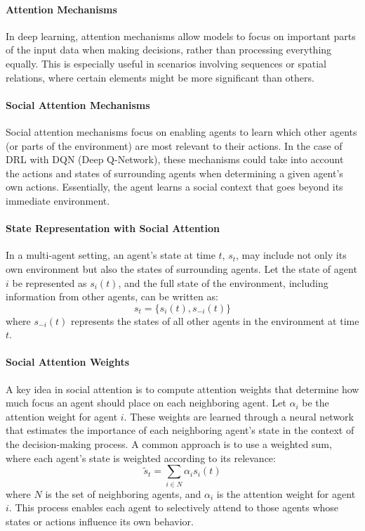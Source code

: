 \begin{enumerate}
\paragraph{Attention Mechanisms} 
In deep learning, attention mechanisms allow models to focus on important parts of the input data when making decisions, 
rather than processing everything equally\cite{vaswani2017attention}. 
This is especially useful in scenarios involving sequences or spatial relations, where certain elements might be more significant than others.

\paragraph{Social Attention Mechanisms} 
Social attention mechanisms focus on enabling agents to learn which other agents (or parts of the environment) are most relevant to their actions. 
In the case of DRL with DQN (Deep Q-Network), these mechanisms could take into account the actions and states of surrounding agents when determining a given agent's own actions. 
Essentially, the agent learns a social context that goes beyond its immediate environment\cite{jiang2018learning}.


\paragraph{State Representation with Social Attention} 
In a multi-agent setting, an agent’s state at time $t$, $s_t$, may include not only its own environment but also the states of surrounding agents. Let the state of agent $i$ be represented as $s_i(t)$, and the full state of the environment, including information from other agents, can be written as:
\[
s_t = \{s_i(t), s_{-i}(t)\}
\]
where $s_{-i}(t)$ represents the states of all other agents in the environment at time $t$\cite{mnih2015human}.

\paragraph{Social Attention Weights} 
A key idea in social attention is to compute attention weights that determine how much focus an agent should place on each neighboring agent. Let $\alpha_i$ be the attention weight for agent $i$. These weights are learned through a neural network that estimates the importance of each neighboring agent's state in the context of the decision-making process. A common approach is to use a weighted sum, where each agent’s state is weighted according to its relevance:
\[
\tilde{s}_t = \sum_{i \in N} \alpha_i s_i(t)
\]
where $N$ is the set of neighboring agents, and $\alpha_i$ is the attention weight for agent $i$. This process enables each agent to selectively attend to those agents whose states or actions influence its own behavior.


\end{enumerate}
